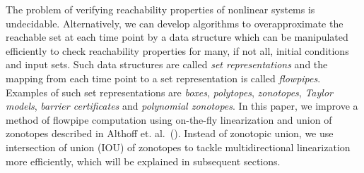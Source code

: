 %
The problem of verifying reachability properties of nonlinear systems
is undecidable.  Alternatively, we can develop algorithms to
overapproximate the reachable set at each time point by a data
structure which can be manipulated efficiently to check reachability
properties for many, if not all, initial conditions and input sets.
Such data structures are called \emph{set representations} and the
mapping from each time point to a set representation is
called \emph{flowpipes}.  Examples of such set representations
are \emph{boxes}, \emph{polytopes}, \emph{zonotopes}, \emph{Taylor
models}, \emph{barrier certificates} and \emph{polynomial zonotopes}.
In this paper, we improve a method of flowpipe computation using
on-the-fly linearization and union of zonotopes described in Althoff
et. al.~().  Instead of zonotopic union, we use
intersection of union (IOU) of zonotopes to tackle multidirectional
linearization more efficiently, which will be explained in subsequent
sections.
%
